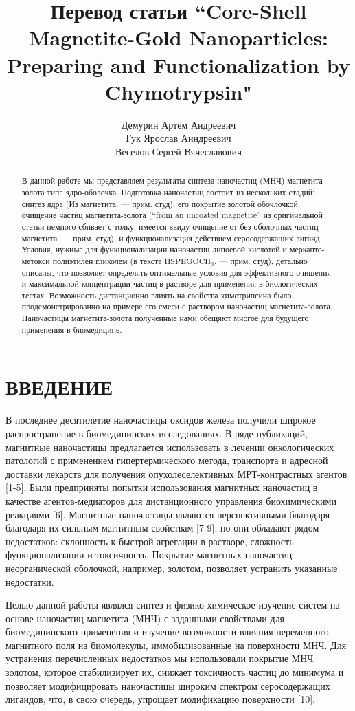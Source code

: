 \documentclass[12pt, a4paper]{article}
\title{Перевод статьи ``Core-Shell Magnetite-Gold Nanoparticles: Preparing and Functionalization by Chymotrypsin"}
\author{Демурин Артём Андреевич \\ Гук Ярослав Анндреевич  \\ Веселов Сергей Вячеславович}
\date{}
\begin{document}
\maketitle

\begin{abstract}
В данной работе мы представляем результаты синтеза наночастиц (МНЧ) магнетита-
золота типа ядро-оболочка. Подготовка наночастиц состоит из нескольких стадий:
синтез ядра (Из магнетита. --- прим. студ), его покрытие золотой обочлочкой,
очищение частиц магнетита-золота (``from an uncoated magnetite'' из оригинальной
статьи немного сбивает с толку, имеется ввиду очищение от без-оболочных частиц
магнетита. --- прим. студ), и функционализация действием серосодержащих лиганд.
Условия, нужные для функционализации наночастиц липоевой кислотой и меркапто-метокси
полиэтилен гликолем (в тексте $\text{HSPEGOCH}_3$. --- прим. студ), детально описаны,
что позволяет определять оптимальные условия для эффективного очищения и 
максимальной концентрации частиц в растворе для применения в биологических 
тестах. Возможность дистанционно влиять на свойства химотрипсина было продемонстрированно
на примере его смеси с раствором наночастиц магнетита-золота. Наночастицы
магнетита-золота полученные нами обещяют многое для будущего применения 
в биомедицине.
\end{abstract}

\section*{ВВЕДЕНИЕ}
В последнее десятилетие наночастицы оксидов железа получили широкое распространение в биомедицинских исследованиях. В ряде публикаций,
магнитные наночастицы предлагается использовать в лечении онкологических патологий с применением гипертермического метода,
транспорта и адресной доставки лекарств для получения опухолеселективных МРТ-контрастных агентов [1-5]. Были предприняты попытки использования магнитных наночастиц
в качестве агентов-медиаторов для дистанционного управления биохимическими реакциями [6]. Магнитные наночастицы являются перспективными благодаря
благодаря их сильным магнитным свойствам [7-9], но они обладают рядом недостатков: склонность к быстрой агрегации в
растворе, сложность функционализации и токсичность. Покрытие магнитных наночастиц неорганической оболочкой, например, золотом,
позволяет устранить указанные недостатки.

Целью данной работы являлся синтез и физико-химическое изучение систем на основе наночастиц магнетита (МНЧ)
с заданными свойствами для биомедицинского применения и изучение возможности влияния переменного магнитного поля
на биомолекулы, иммобилизованные на поверхности МНЧ. Для устранения перечисленных недостатков мы использовали покрытие
МНЧ золотом, которое стабилизирует их, снижает токсичность частиц до минимума и позволяет модифицировать
наночастицы широким спектром серосодержащих лигандов, что, в свою очередь, упрощает модификацию поверхности [10].
\end{document}
